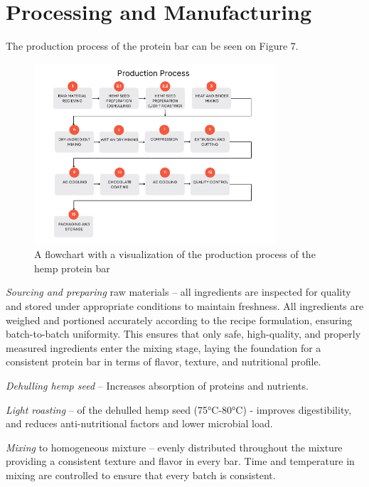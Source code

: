 \section{Processing and Manufacturing}
The production process of the protein bar can be seen on Figure 7.
\begin{figure}[H]
    \centering
    \includegraphics[width=0.8\textwidth]{Figures/fig_process_01.png}
    \caption{A flowchart with a visualization of the production process of the hemp protein bar}
    \label{fig:process_flow_diagram}
\end{figure}

\textit{Sourcing and preparing} raw materials – all ingredients are inspected for quality and stored under appropriate conditions to maintain freshness. All ingredients are weighed and portioned accurately according to the recipe formulation, ensuring batch-to-batch uniformity. This ensures that only safe, high-quality, and properly measured ingredients enter the mixing stage, laying the foundation for a consistent protein bar in terms of flavor, texture, and nutritional profile.

\vspace{1em}
\textit{Dehulling hemp seed} – Increases absorption of proteins and nutrients.

\vspace{1em}
\textit{Light roasting} – of the dehulled hemp seed (75°C-80°C) - improves digestibility, and reduces anti-nutritional factors and lower microbial load.

\vspace{1em}
\textit{Mixing} to homogeneous mixture – evenly distributed throughout the mixture providing a consistent texture and flavor in every bar. Time and temperature in mixing are controlled to ensure that every batch is consistent.

